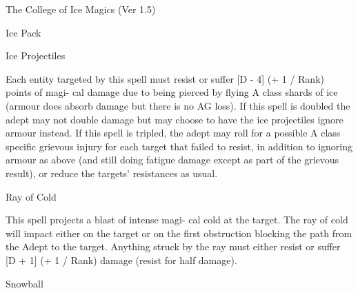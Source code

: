\begin{Chapter}{The College of Ice Magics (Ver 1.5)}
\begin{spell}[S-10]{Ice Pack }
\end{spell}

\begin{spell}[S-11]{Ice Projectiles }

\begin{effects}
 Each  entity  targeted  by  this  spell  must 
resist or suffer [D - 4] (+ 1 / Rank) points of magi-
cal damage due to being pierced by flying A class 
shards of ice (armour does absorb damage but there 
is  no  AG  loss).  If  this  spell  is  doubled  the  adept 
may  not  double  damage  but  may  choose  to  have 
the  ice  projectiles  ignore  armour  instead.  If  this 
spell is tripled, the adept may roll for a possible A 
class  specific  grievous  injury  for  each  target  that 
failed  to  resist,  in  addition  to  ignoring  armour  as 
above  (and  still  doing  fatigue  damage  except  as 
part  of  the  grievous  result),  or  reduce  the  targets’ 
resistances as usual. 

\end{effects}
\end{spell}

\begin{spell}[S-12]{Ray of Cold }

\begin{effects}
This spell projects a blast of intense magi-
cal  cold  at  the  target.  The  ray  of  cold  will  impact 
either  on  the  target  or  on  the  first  obstruction 
blocking  the  path  from  the  Adept  to  the  target. 
Anything  struck  by  the  ray  must  either  resist  or 
suffer [D + 1] (+ 1 / Rank) damage (resist for half 
damage). 

\end{effects}
\end{spell}

\begin{spell}[S-13]{Snowball }


\end{spell}
\end{Chapter}
